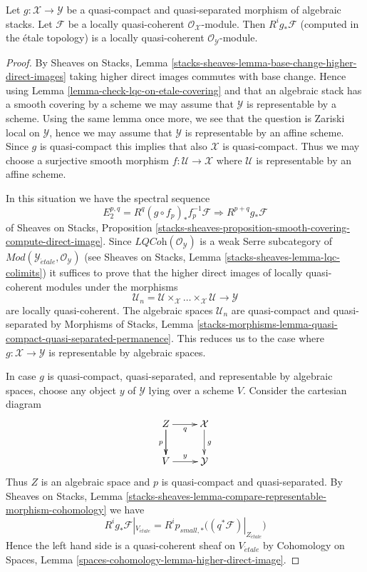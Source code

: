 \begin{lemma}
\label{lemma-pushforward-locally-quasi-coherent}
Let $g : \mathcal{X} \to \mathcal{Y}$ be a quasi-compact and
quasi-separated morphism of algebraic stacks. Let 
$\mathcal{F}$ be a locally quasi-coherent
$\mathcal{O}_\mathcal{X}$-module. Then $R^ig_*\mathcal{F}$
(computed in the \'etale topology) is
a locally quasi-coherent $\mathcal{O}_\mathcal{Y}$-module.
\end{lemma}

\begin{proof}
By
Sheaves on Stacks, Lemma
\ref{stacks-sheaves-lemma-base-change-higher-direct-images}
taking higher direct images commutes with base change.
Hence using
Lemma \ref{lemma-check-lqc-on-etale-covering}
and that an algebraic stack has a smooth covering by
a scheme we may assume that $\mathcal{Y}$ is representable by a scheme.
Using the same lemma once more, we see that
the question is Zariski local on $\mathcal{Y}$, hence we may assume that
$\mathcal{Y}$ is representable by an affine scheme. Since $g$ is
quasi-compact this implies that also $\mathcal{X}$ is quasi-compact.
Thus we may choose a surjective smooth morphism
$f : \mathcal{U} \to \mathcal{X}$ where $\mathcal{U}$ is representable
by an affine scheme.

\medskip\noindent
In this situation we have the spectral sequence
$$
E_2^{p, q} = R^q(g \circ f_p)_*f_p^{-1}\mathcal{F}
\Rightarrow
R^{p + q}g_*\mathcal{F}
$$
of
Sheaves on Stacks, Proposition
\ref{stacks-sheaves-proposition-smooth-covering-compute-direct-image}.
Since $\textit{LQCoh}(\mathcal{O}_\mathcal{Y})$ is a weak Serre subcategory
of
$\textit{Mod}(\mathcal{Y}_{\acute{e}tale}, \mathcal{O}_\mathcal{Y})$
(see
Sheaves on Stacks, Lemma \ref{stacks-sheaves-lemma-lqc-colimits})
it suffices to prove that the higher direct images of locally
quasi-coherent modules under the morphisms
$$
\mathcal{U}_n =
\mathcal{U} \times_\mathcal{X} \ldots \times_\mathcal{X} \mathcal{U}
\longrightarrow
\mathcal{Y}
$$
are locally quasi-coherent. The algebraic spaces $\mathcal{U}_n$
are quasi-compact and quasi-separated by
Morphisms of Stacks, Lemma
\ref{stacks-morphisms-lemma-quasi-compact-quasi-separated-permanence}.
This reduces us to the case where $g : \mathcal{X} \to \mathcal{Y}$
is representable by algebraic spaces.

\medskip\noindent
In case $g$ is quasi-compact, quasi-separated, and representable by algebraic
spaces, choose any object $y$ of $\mathcal{Y}$ lying over a scheme $V$.
Consider the cartesian diagram
$$
\xymatrix{
Z \ar[d] \ar[r]_q \ar[d]_p & \mathcal{X} \ar[d]^g \\
V \ar[r]^y & \mathcal{Y}
}
$$
Thus $Z$ is an algebraic space and $p$ is quasi-compact and quasi-separated.
By Sheaves on Stacks, Lemma
\ref{stacks-sheaves-lemma-compare-representable-morphism-cohomology}
we have
$$
R^ig_*\mathcal{F}|_{V_{\acute{e}tale}} =
R^ip_{small, *}\big((q^*\mathcal{F})|_{Z_{\acute{e}tale}}\big)
$$
Hence the left hand side is a quasi-coherent sheaf on $V_{\acute{e}tale}$
by Cohomology on Spaces, Lemma
\ref{spaces-cohomology-lemma-higher-direct-image}.
\end{proof}

